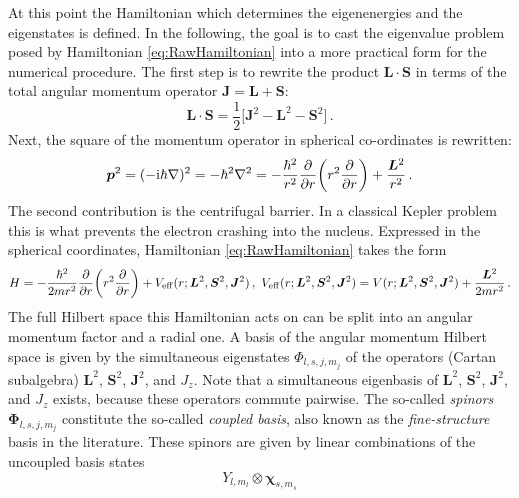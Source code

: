\documentclass[fontsize=12pt,
               twoside=false,
               BCOR=0mm,
               DIV=14,
               overfullrule=false, %
               toc=bibliography,
               headinclude=true,
               footinclude=false]{scrartcl}
\numberwithin{equation}{section}
\newcommand{\ii}{\mathrm{i}}
\begin{document}
    At this point the Hamiltonian which determines the eigenenergies and the
    eigenstates is defined. In the following, the goal is to cast the eigenvalue
    problem posed by Hamiltonian \eqref{eq:RawHamiltonian} into a more practical
    form for the numerical procedure. The first step is to rewrite the product
    $\bm{L}\cdot\bm{S}$ in terms of the total angular momentum operator
    $\bm{J}=\bm{L}+\bm{S}$:
    \begin{equation}
        \bm{L}\cdot\bm{S}
        =
        \frac{1}{2}\big[\bm{J}^2-\bm{L}^2-\bm{S}^2\big]
    \,.
    \end{equation}
    Next, the square of the momentum operator in spherical co-ordinates is
    rewritten:
    \begin{equation}
        \bm{p}^2
        =
        (-\ii\hbar\nabla)^2
        =
        -\hbar^2\nabla^2
        =
        -\frac{\hbar^2}{r^2}\pdv{r}(r^2\pdv{r})+\frac{\bm{L}^2}{r^2}
    \,.
    \end{equation}
    The second contribution is the centrifugal barrier. In a classical Kepler
    problem this is what prevents the electron crashing into the nucleus.
    Expressed in the spherical coordinates, Hamiltonian
    \eqref{eq:RawHamiltonian} takes the form
    \begin{equation}
        H
        =
        -\frac{\hbar^2}{2mr^2}\pdv{r}(r^2\pdv{r})
        +
        V_\mathrm{eff}(r;\bm{L}^2,\bm{S}^2,\bm{J}^2)
    \,, \
        V_\mathrm{eff}(r;\bm{L}^2,\bm{S}^2,\bm{J}^2)
        =
        V(r;\bm{L}^2,\bm{S}^2,\bm{J}^2)
        +
        \frac{\bm{L}^2}{2mr^2}
    \,.
    \end{equation}
    The full Hilbert space this Hamiltonian acts on can be split into an angular
    momentum factor and a radial one. A basis of the angular momentum Hilbert
    space is given by the simultaneous eigenstates $\Phi_{l,s,j,m_j}$ of the
    operators (Cartan subalgebra) $\bm{L}^2$, $\bm{S}^2$, $\bm{J}^2$, and $J_z$.
    Note that a simultaneous eigenbasis of $\bm{L}^2$, $\bm{S}^2$, $\bm{J}^2$,
    and $J_z$ exists, because these operators commute pairwise. The so-called
    \emph{spinors} $\bm{\Phi}_{l,s,j,m_j}$ constitute the so-called
    \emph{coupled basis}, also known as the \emph{fine-structure} basis in the
    literature. These spinors are given by linear combinations of the uncoupled
    basis states
    \begin{equation}\label{eq:UncoupledSpinors}
        Y_{l,m_l}\otimes\bm{\chi}_{s,m_s}
    \end{equation}
\end{document}
